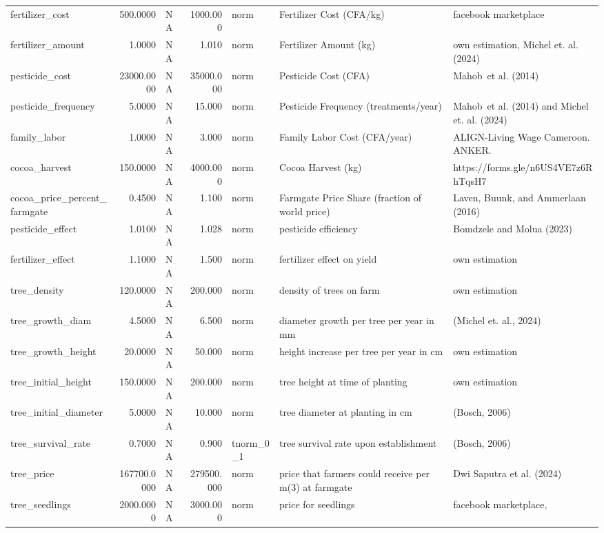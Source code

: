 \documentclass[
]{article}
\begin{document}
\begin{longtable}[t]{lrlrlll}
fertilizer\_cost & 500.0000 & NA & 1000.000 & norm & Fertilizer Cost (CFA/kg) & facebook marketplace\\
fertilizer\_amount & 1.0000 & NA & 1.010 & norm & Fertilizer Amount (kg) & own estimation, Michel et. al. (2024)\\
\addlinespace
pesticide\_cost & 23000.0000 & NA & 35000.000 & norm & Pesticide Cost (CFA) & Mahob et al. (2014)\\
pesticide\_frequency & 5.0000 & NA & 15.000 & norm & Pesticide Frequency (treatments/year) & Mahob et al. (2014) and Michel et. al. (2024)\\
family\_labor & 1.0000 & NA & 3.000 & norm & Family Labor Cost (CFA/year) & ALIGN-Living Wage Cameroon. ANKER.\\
cocoa\_harvest & 150.0000 & NA & 4000.000 & norm & Cocoa Harvest (kg) & https://forms.gle/n6US4VE7z6RhTqsH7\\
cocoa\_price\_percent\_farmgate & 0.4500 & NA & 1.100 & norm & Farmgate Price Share (fraction of world price) & Laven, Buunk, and Ammerlaan (2016)\\
\addlinespace
pesticide\_effect & 1.0100 & NA & 1.028 & norm & pesticide efficiency & Bomdzele and Molua (2023)\\
fertilizer\_effect & 1.1000 & NA & 1.500 & norm & fertilizer effect on yield & own estimation\\
tree\_density & 120.0000 & NA & 200.000 & norm & density of trees on farm & own estimation\\
tree\_growth\_diam & 4.5000 & NA & 6.500 & norm & diameter growth per tree per year in mm & (Michel et. al., 2024)\\
tree\_growth\_height & 20.0000 & NA & 50.000 & norm & height increase per tree per year in cm & own estimation\\
\addlinespace
tree\_initial\_height & 150.0000 & NA & 200.000 & norm & tree height at time of planting & own estimation\\
tree\_initial\_diameter & 5.0000 & NA & 10.000 & norm & tree diameter at planting in cm & (Bosch, 2006)\\
tree\_survival\_rate & 0.7000 & NA & 0.900 & tnorm\_0\_1 & tree survival rate upon establishment & (Bosch, 2006)\\
tree\_price & 167700.0000 & NA & 279500.000 & norm & price that farmers could receive per m(3) at farmgate & Dwi Saputra et al. (2024)\\
tree\_seedlings & 2000.0000 & NA & 3000.000 & norm & price for seedlings & facebook marketplace,\\

\end{longtable}
\end{document}
